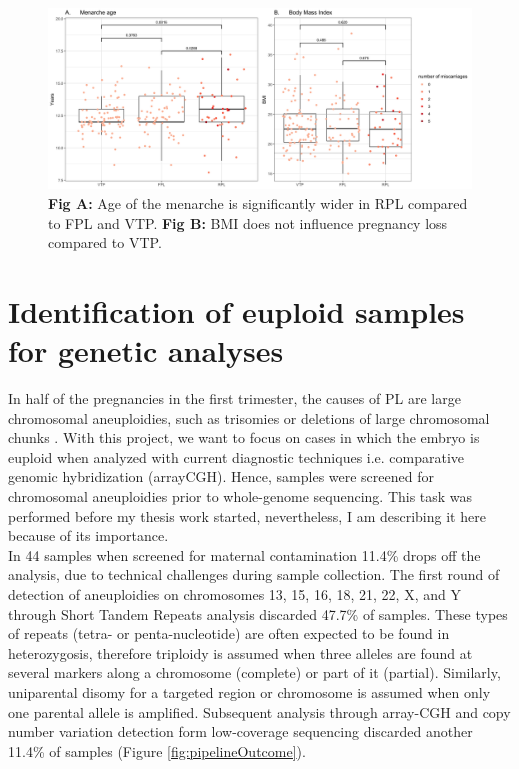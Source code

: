 \begin{figure}[H]
\centering
\includegraphics[width=1.15\textwidth]{fig/panel_BMI_MenAge.png}
\decoRule
\caption{\textbf{Fig A:} Age of the menarche is significantly wider in RPL compared to FPL and VTP. \textbf{Fig B:} BMI does not influence pregnancy loss compared to VTP.}
\label{fig:panel_BMI_MenAge}
\end{figure}




\section{Identification of euploid samples for genetic analyses}
In half of the pregnancies in the first trimester, the causes of PL are large chromosomal aneuploidies, such as trisomies or deletions of large chromosomal chunks \cite{goddijn2000genetic,zhang2009genetic}. With this project, we want to focus on cases in which the embryo is euploid when analyzed with current diagnostic techniques i.e. comparative genomic hybridization (arrayCGH). Hence, samples were screened for chromosomal aneuploidies prior to whole-genome sequencing. This task was performed before my thesis work started, nevertheless, I am describing it here because of its importance. \\

In 44 samples when screened for maternal contamination 11.4\% drops off the analysis, due to technical challenges during sample collection. The first round of detection of aneuploidies on chromosomes 13, 15, 16, 18, 21, 22, X, and Y through Short Tandem Repeats analysis discarded 47.7\% of samples. These types of repeats (tetra- or penta-nucleotide) are often expected to be found in heterozygosis, therefore triploidy is assumed when three alleles are found at several markers along a chromosome (complete) or part of it (partial). Similarly, uniparental disomy for a targeted region or chromosome is assumed when only one parental allele is amplified. Subsequent analysis through array-CGH and \gls{copy number variation} detection form low-coverage sequencing discarded another 11.4\% of samples (Figure \ref{fig:pipelineOutcome}).


